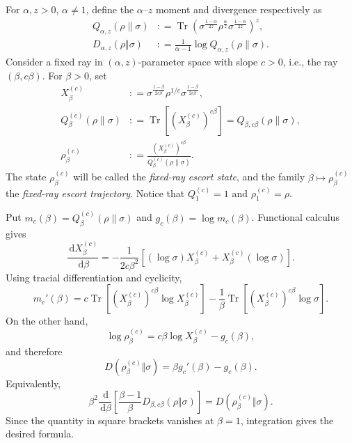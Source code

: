 \documentclass[12pt]{article}
\numberwithin{equation}{section}
\theoremstyle{definition}
\theoremstyle{remark}
\newcommand{\dd}{\,\mathrm d}
\newcommand{\az}{$\alpha$--$z$}
\newcommand{\?}{\overset{?}{=}}
\newcommand{\defeq}{\mathrel{\mathop:}=}
\DeclareMathOperator{\Tr}{Tr}
\begin{document}
For $\alpha,z>0$, $\alpha\ne1$, define the {\az} moment and divergence respectively as
\begin{align}
  Q_{\alpha,z}(\rho\|\sigma)
  &\defeq
  \Tr\!\left(
    \sigma^{\frac{1-\alpha}{2z}}
    \rho^{\frac\alpha z}
    \sigma^{\frac{1-\alpha}{2z}}
  \right)^z,
  \label{eq:fd-alpha-z-moment}\\
  D_{\alpha,z}(\rho\Vert\sigma)
  &\defeq \frac{1}{\alpha-1}
  \log Q_{\alpha,z}(\rho\|\sigma).
  \label{eq:fd-alpha-z-divergence}
\end{align}
Consider a fixed ray in $(\alpha,z)$-parameter space with slope $c>0$, i.e., the ray $(\beta,c\beta)$.  For $\beta>0$, set
\begin{align}
  X_{\beta}^{(c)}
  &\defeq
  \sigma^{\frac{1-\beta}{2c\beta}}
  \rho^{1/c}
  \sigma^{\frac{1-\beta}{2c\beta}},
  \label{eq:fd-fixed-ray-factor}\\
  Q_{\beta}^{(c)}(\rho\|\sigma)
  &\defeq
  \Tr\!\left[(X_{\beta}^{(c)})^{c\beta}\right]
  =Q_{\beta,c\beta}(\rho\|\sigma),
  \label{eq:fd-fixed-ray-moment}\\
  \rho_{\beta}^{(c)}
  &\defeq
  \frac{(X_{\beta}^{(c)})^{c\beta}}
       {Q_{\beta}^{(c)}(\rho\|\sigma)}.
  \label{eq:fd-fixed-ray-escort}
\end{align}
The state $\rho_{\beta}^{(c)}$ will be called the \emph{fixed-ray
escort state}, and the family
$\beta\mapsto\rho_{\beta}^{(c)}$ the \emph{fixed-ray escort trajectory}.
Notice that $Q_1^{(c)}=1$ and
$\rho_1^{(c)}=\rho$.

Put $m_c(\beta)=Q_{\beta}^{(c)}(\rho\|\sigma)$ and
$g_c(\beta)=\log m_c(\beta)$.  Functional calculus gives
\begin{equation}
  \frac{\dd X_{\beta}^{(c)}}{\dd\beta}
  =-\frac{1}{2c\beta^2}
  \left[(\log\sigma)X_{\beta}^{(c)}
       +X_{\beta}^{(c)}(\log\sigma)\right].
  \label{eq:fd-factor-derivative}
\end{equation}
Using tracial differentiation and cyclicity,
\begin{equation}
  m_c'(\beta)
  =c\Tr\!\left[(X_{\beta}^{(c)})^{c\beta}
                  \log X_{\beta}^{(c)}\right]
   -\frac1\beta\Tr\!\left[(X_{\beta}^{(c)})^{c\beta}
                  \log\sigma\right].
  \label{eq:fd-moment-derivative}
\end{equation}
On the other hand,
\begin{equation}
  \log\rho_{\beta}^{(c)}
  =c\beta\log X_{\beta}^{(c)}-g_c(\beta),
\end{equation}
and therefore
\begin{equation}
  D(\rho_{\beta}^{(c)}\Vert\sigma)
  =\beta g_c'(\beta)-g_c(\beta).
  \label{eq:fd-refined-identity}
\end{equation}
Equivalently,
\begin{equation}
  \beta^2\frac{\dd}{\dd\beta}
  \left[
    \frac{\beta-1}{\beta}
    D_{\beta,c\beta}(\rho\Vert\sigma)
  \right]
  =D(\rho_{\beta}^{(c)}\Vert\sigma).
  \label{eq:fd-ray-refined-identity}
\end{equation}
Since the quantity in square brackets vanishes at $\beta=1$,
integration gives the desired formula.
\end{document}
